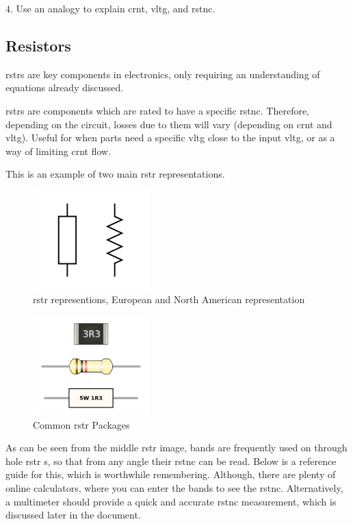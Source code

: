 \documentclass[a4paper,11pt]{report}
\newcommand{\Theory}[1] %
{
\phantomsection %
\todo[inline, color=green!30]{\textbf{#1}} %
\vspace{1em} %
}
\begin{document}
4. Use an analogy to explain \gls{crnt}, \gls{vltg}, and \gls{rstnc}.

\vspace*{1\baselineskip}

\subsection{Resistors}

\Theory{What are \gls{rstr}s?}

\gls{rstr}s are key components in electronics, only requiring an understanding of equations already discussed.

\gls{rstr}s are components which are rated to have a specific \gls{rstnc}. Therefore, depending on the circuit, losses due to them will vary (depending on \gls{crnt} and \gls{vltg}). Useful for when parts need a specific \gls{vltg} close to the input \gls{vltg}, or as a way of limiting \gls{crnt} flow.

This is an example of two main \gls{rstr} representations.

\begin{figure}[H]
\centering
\includegraphics[width=0.4\textwidth]{resistor1}
\caption{\gls{rstr} representions, European and North American representation}
\end{figure}

\begin{figure}[H]
\centering
\includegraphics[width=0.4\textwidth]{resistorPackages}
\caption{Common \gls{rstr} Packages}
\end{figure}

As can be seen from the middle \gls{rstr} image, bands are frequently used on through hole \gls{rstr} s, so that from any angle their \gls{rstnc} can be read. Below is a reference guide for this, which is worthwhile remembering. Although, there are plenty of online calculators, where you can enter the bands to see the \gls{rstnc}. Alternatively, a multimeter should provide a quick and accurate \gls{rstnc} measurement, which is discussed later in the document.
\end{document}
